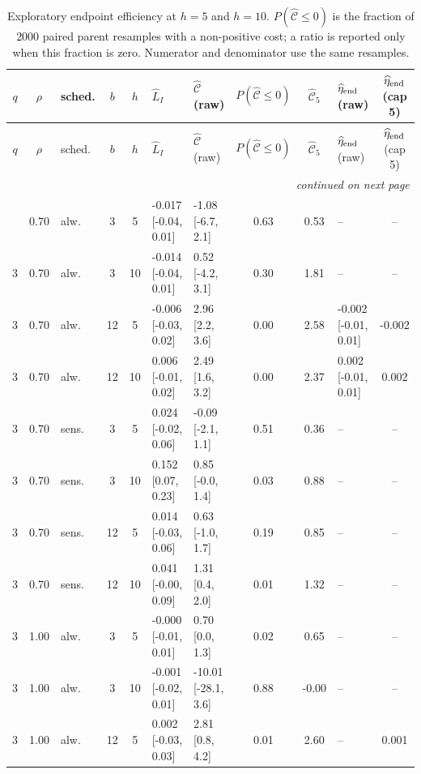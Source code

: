 \begin{scriptsize}
\setlength{\tabcolsep}{3pt}
\begin{longtable}{cclcc l l c c l c}
\caption{Exploratory endpoint efficiency at $h=5$ and $h=10$. $P(\widehat{\mathcal C}\le0)$ is the fraction of 2000 paired parent resamples with a non-positive cost; a ratio is reported only when this fraction is zero. Numerator and denominator use the same resamples.}\label{tab:efficiency}\\
\toprule
$q$ & $\rho$ & sched. & $b$ & $h$ & $\widehat L_I$ & $\widehat{\mathcal C}$ (raw) & $P(\widehat{\mathcal C}\le0)$ & $\widehat{\mathcal C}_5$ & $\widehat\eta_{\rm end}$ (raw) & $\widehat\eta_{\rm end}$ (cap 5) \\
\midrule
\endfirsthead
\toprule
$q$ & $\rho$ & sched. & $b$ & $h$ & $\widehat L_I$ & $\widehat{\mathcal C}$ (raw) & $P(\widehat{\mathcal C}\le0)$ & $\widehat{\mathcal C}_5$ & $\widehat\eta_{\rm end}$ (raw) & $\widehat\eta_{\rm end}$ (cap 5) \\
\midrule
\endhead
\midrule
\multicolumn{11}{r}{\emph{continued on next page}}\\
\endfoot
\bottomrule
\endlastfoot
3 & 0.70 & alw. & 3 & 5 & -0.017 [-0.04, 0.01] & -1.08 [-6.7, 2.1] & 0.63 & 0.53 & -- & -- \\
3 & 0.70 & alw. & 3 & 10 & -0.014 [-0.04, 0.01] & 0.52 [-4.2, 3.1] & 0.30 & 1.81 & -- & -- \\
3 & 0.70 & alw. & 12 & 5 & -0.006 [-0.03, 0.02] & 2.96 [2.2, 3.6] & 0.00 & 2.58 & -0.002 [-0.01, 0.01] & -0.002 \\
3 & 0.70 & alw. & 12 & 10 & 0.006 [-0.01, 0.02] & 2.49 [1.6, 3.2] & 0.00 & 2.37 & 0.002 [-0.01, 0.01] & 0.002 \\
3 & 0.70 & sens. & 3 & 5 & 0.024 [-0.02, 0.06] & -0.09 [-2.1, 1.1] & 0.51 & 0.36 & -- & -- \\
3 & 0.70 & sens. & 3 & 10 & 0.152 [0.07, 0.23] & 0.85 [-0.0, 1.4] & 0.03 & 0.88 & -- & -- \\
3 & 0.70 & sens. & 12 & 5 & 0.014 [-0.03, 0.06] & 0.63 [-1.0, 1.7] & 0.19 & 0.85 & -- & -- \\
3 & 0.70 & sens. & 12 & 10 & 0.041 [-0.00, 0.09] & 1.31 [0.4, 2.0] & 0.01 & 1.32 & -- & -- \\
3 & 1.00 & alw. & 3 & 5 & -0.000 [-0.01, 0.01] & 0.70 [0.0, 1.3] & 0.02 & 0.65 & -- & -- \\
3 & 1.00 & alw. & 3 & 10 & -0.001 [-0.02, 0.01] & -10.01 [-28.1, 3.6] & 0.88 & -0.00 & -- & -- \\
3 & 1.00 & alw. & 12 & 5 & 0.002 [-0.03, 0.03] & 2.81 [0.8, 4.2] & 0.01 & 2.60 & -- & 0.001 \\

\end{longtable}
\end{scriptsize}
